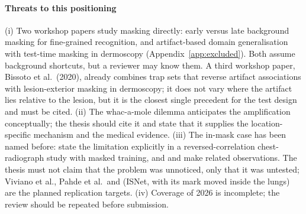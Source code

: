 \documentclass[11pt,a4paper]{article}
\begin{document}
\paragraph{Threats to this positioning} (i) Two workshop papers study masking directly: early versus late background
masking for fine-grained recognition, and artifact-based domain generalisation with test-time masking in dermoscopy
(Appendix~\ref{app:excluded}). Both assume background shortcuts, but a reviewer may know them. A third
workshop paper, Bissoto et al.\ (2020), already combines trap sets that reverse artifact associations with
lesion-exterior masking in dermoscopy; it does not vary where the artifact lies relative to the lesion, but it is the
closest single precedent for the test design and must be cited. (ii) The whac-a-mole
dilemma \citep{li2023whacamole} anticipates the amplification conceptually; the thesis should cite it and state that it
supplies the location-specific mechanism and the medical evidence. (iii) The in-mask case has been named before: \citet{viviano2021saliency} state the limitation explicitly in a
reversed-correlation chest-radiograph study with masked training, and \citet{benahmed2022multisite} and
\citet{pahde2025ensuring} make related observations. The thesis must not claim that the problem was unnoticed, only
that it was untested; Viviano et al., Pahde et al.\ and \citet{bassi2024isnet} (ISNet, with its mark moved inside the lungs) are the planned replication targets. (iv) Coverage of 2026
is incomplete; the review should be repeated before submission.

\end{document}
